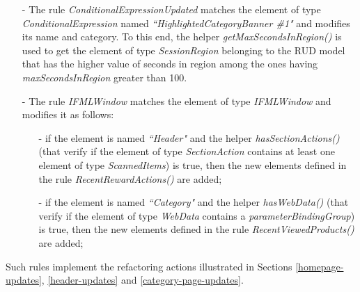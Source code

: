 \begin{itemize}
	\item[-] The rule \textit{ConditionalExpressionUpdated} matches the element of type \textit{ConditionalExpression} named \textit{``HighlightedCategoryBanner \#1"} and modifies its name and category. To this end, the helper \textit{getMaxSecondsInRegion()} is used to get the element of type \textit{SessionRegion} belonging to the RUD model that has the higher value of seconds in region among the ones having \textit{maxSecondsInRegion} greater than 100.

	\item[-] The rule \textit{IFMLWindow} matches the element of type \textit{IFMLWindow} and modifies it as follows: 
\begin{itemize}
	\item[-] if the element is named \textit{``Header"} and the helper \textit{hasSectionActions()} (that verify if the element of type \textit{SectionAction} contains at least one element of type \textit{ScannedItems}) is true, then the new elements defined in the rule \textit{RecentRewardActions()} are added; 
	\item[-] if the element is named \textit{``Category"} and the helper \textit{hasWebData()} (that verify if the element of type \textit{WebData} contains a  \textit{parameterBindingGroup}) is true, then the new elements defined in the rule \textit{RecentViewedProducts()} are added; 
\end{itemize} 
\end{itemize}

Such rules implement the refactoring actions illustrated in Sections \ref{homepage-updates}, \ref{header-updates} and \ref{category-page-updates}.
\vspace{0.5cm}


